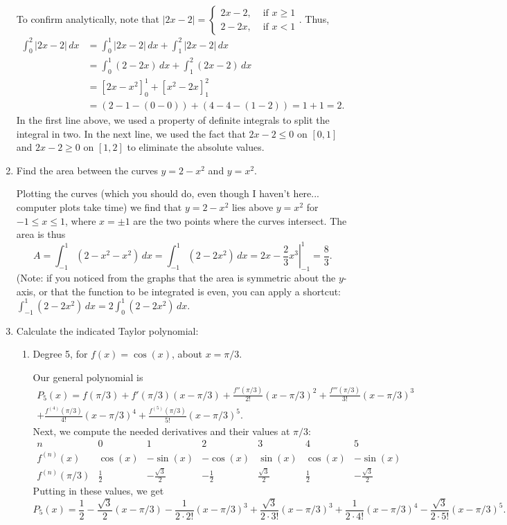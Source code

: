 \documentclass[12pt]{article}
\newcommand{\di}{\displaystyle}
\newcommand{\abs}[1]{\lvert #1\rvert}
\begin{document}
\begin{enumerate}
To confirm analytically, note that $\abs{2x-2} = \begin{cases} 2x-2, &\text{ if } x\geq 1\\ 2-2x, &\text{ if } x<1\end{cases}$. Thus,
\begin{align*}
\int_0^2\abs{2x-2}\,dx &= \int_0^1\abs{2x-2}\,dx + \int_1^2\abs{2x-2}\,dx\\
& = \int_0^1(2-2x)\,dx + \int_1^2(2x-2)\,dx\\
& = [2x-x^2]_0^1 + [x^2-2x]_1^2\\
& = (2-1-(0-0))+(4-4-(1-2))=1+1=2.
\end{align*}
In the first line above, we used a property of definite integrals to split the integral in two. In the next line, we used the fact that $2x-2\leq 0$ on $[0,1]$ and $2x-2\geq 0$ on $[1,2]$ to eliminate the absolute values.

 \item Find the area between the curves $y= 2-x^2$ and $y=x^2$.

Plotting the curves (which you should do, even though I haven't here... computer plots take time) we find that $y=2-x^2$ lies above $y=x^2$ for $-1\leq x\leq 1$, where $x=\pm 1$ are the two points where the curves intersect. The area is thus
\[
A = \int_{-1}^1(2-x^2-x^2)\,dx = \int_{-1}^1(2-2x^2)\,dx = \left. 2x-\frac23 x^3\right|_{-1}^1 = \frac{8}{3}.
\]
(Note: if you noticed from the graphs that the area is symmetric about the $y$-axis, or that the function to be integrated is even, you can apply a shortcut: $\di \int_{-1}^1(2-2x^2)\,dx = 2\int_0^1 (2-2x^2)\,dx$.

\newpage

\item Calculate the indicated Taylor polynomial:
\begin{enumerate}
\item Degree 5, for $f(x)=\cos(x)$, about $x=\pi/3$.

Our general polynomial is
\begin{multline*}
P_5(x) = f(\pi/3)+f'(\pi/3)(x-\pi/3)+\frac{f''(\pi/3)}{2!}(x-\pi/3)^2+\frac{f'''(\pi/3)}{3!}(x-\pi/3)^3\\+\frac{f^{(4)}(\pi/3)}{4!}(x-\pi/3)^4+\frac{f^{(5)}(\pi/3)}{5!}(x-\pi/3)^5.
\end{multline*}
Next, we compute the needed derivatives and their values at $\pi/3$:
\[
\begin{array}{c|cccccc}
n&0&1&2&3&4&5\\
f^{(n)}(x)&\cos(x)&-\sin(x)&-\cos(x)&\sin(x)&\cos(x)&-\sin(x)\\
f^{(n)}(\pi/3)&\frac12&-\frac{\sqrt{3}}{2}&-\frac12&\frac{\sqrt{3}}{2}&\frac12&-\frac{\sqrt{3}}{2}
\end{array}
\]
Putting in these values, we get
\[
P_5(x) = \frac12-\frac{\sqrt{3}}{2}(x-\pi/3)-\frac{1}{2\cdot 2!}(x-\pi/3)^3+\frac{\sqrt{3}}{2\cdot 3!}(x-\pi/3)^3 +\frac{1}{2\cdot 4!}(x-\pi/3)^4-\frac{\sqrt{3}}{2\cdot 5!}(x-\pi/3)^5.
\]


\end{enumerate}
\end{enumerate}
\end{document}
